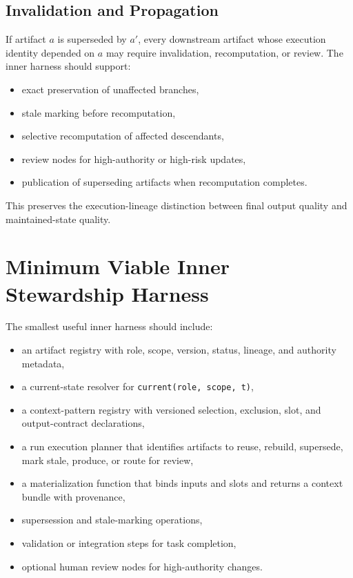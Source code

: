 \documentclass{article}
\begin{document}
\subsection{Invalidation and Propagation}

If artifact $a$ is superseded by $a'$, every downstream artifact whose execution identity depended on $a$ may require invalidation, recomputation, or review. The inner harness should support:
\begin{itemize}[leftmargin=*]
\item exact preservation of unaffected branches,
\item stale marking before recomputation,
\item selective recomputation of affected descendants,
\item review nodes for high-authority or high-risk updates,
\item publication of superseding artifacts when recomputation completes.
\end{itemize}

This preserves the execution-lineage distinction between final output quality and maintained-state quality.

\section{Minimum Viable Inner Stewardship Harness}

The smallest useful inner harness should include:
\begin{itemize}[leftmargin=*]
\item an artifact registry with role, scope, version, status, lineage, and authority metadata,
\item a current-state resolver for \texttt{current(role, scope, t)},
\item a context-pattern registry with versioned selection, exclusion, slot, and output-contract declarations,
\item a run execution planner that identifies artifacts to reuse, rebuild, supersede, mark stale, produce, or route for review,
\item a materialization function that binds inputs and slots and returns a context bundle with provenance,
\item supersession and stale-marking operations,
\item validation or integration steps for task completion,
\item optional human review nodes for high-authority changes.
\end{itemize}
\end{document}

